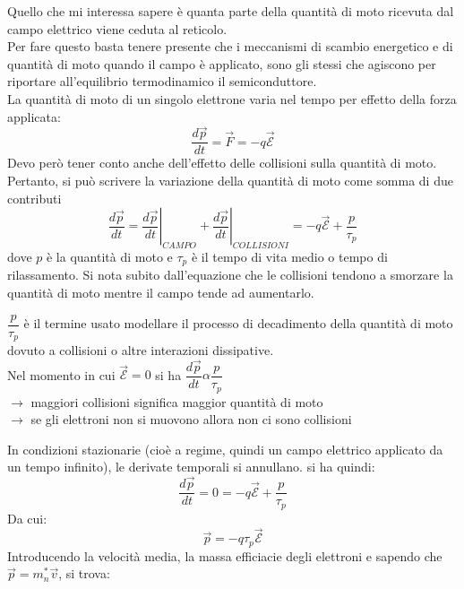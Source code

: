 Quello che mi interessa sapere è quanta parte della quantità di moto ricevuta dal campo elettrico viene ceduta al reticolo.\\
Per fare questo basta tenere presente che i meccanismi di scambio energetico e di quantità di moto quando il campo è applicato, sono gli stessi che agiscono per riportare all'equilibrio termodinamico il semiconduttore.\\

La quantità di moto di un singolo elettrone varia nel tempo per effetto della forza applicata:
%
\begin{equation}
    \dfrac{d\vec{p}}{dt}=\vec{F}=-q \mathcal{\vec{E}}
\end{equation}
%
Devo però tener conto anche dell'effetto delle collisioni sulla quantità di moto. Pertanto, si può scrivere la variazione della quantità di moto come somma di due contributi
\begin{equation}
   \dfrac{d\vec{p}}{dt} =\left. \dfrac{d\vec{p}}{dt}\right\vert_{CAMPO} + \left. \dfrac{d\vec{p}}{dt}\right\vert_{COLLISIONI} = -q \mathcal{\vec{E}} + \dfrac{p}{\tau_p}
\end{equation}
%
dove $p$ è la quantità di moto e $\tau_p$ è il tempo di vita medio o tempo di rilassamento.
Si nota subito dall'equazione che le collisioni tendono a smorzare la quantità di moto mentre il campo tende ad aumentarlo.\\
%
\begin{psbox}
    $\dfrac{p}{\tau_p}$ è il termine usato modellare il processo di decadimento della quantità di moto dovuto a collisioni o altre interazioni dissipative.\\
    Nel momento in cui $\mathcal{\vec{E}}=0$ si ha $\dfrac{d\vec{p}}{dt} \alpha  \dfrac{p}{\tau_p}$\\
    $\rightarrow$ maggiori collisioni significa maggior quantità di moto \\
    $\rightarrow$ se gli elettroni non si muovono allora non ci sono collisioni
\end{psbox}
%
In condizioni stazionarie (cioè a regime,  quindi un campo elettrico applicato da un tempo infinito), le derivate temporali si annullano. si ha quindi:
%
\begin{equation}
   \dfrac{d\vec{p}}{dt} = 0 = -q \mathcal{\vec{E}} + \dfrac{p}{\tau_p}
\end{equation}
%
Da cui:
%
\begin{equation}
   \vec{p}=-q\tau_p\mathcal{\vec{E}}
\end{equation}
%
Introducendo la velocità media, la massa efficiacie degli elettroni e sapendo che $\vec{p}=m_n^* \vec{v}$, si trova:
